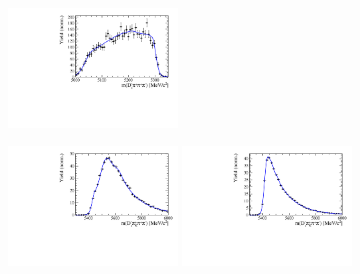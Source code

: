 \begin{figure}[b]
\centering
\includegraphics[height=!,width=0.4\textwidth]{figs/MassFit/BkgShape/Bs2Dsstartpipipi.pdf}

\includegraphics[height=!,width=0.4\textwidth]{figs/MassFit/BkgShape/Bs2Dspipipi_as_DsKpipi_Run1.pdf}
\includegraphics[height=!,width=0.4\textwidth]{figs/MassFit/BkgShape/Bs2Dspipipi_as_DsKpipi_Run2.pdf}


\end{figure}

